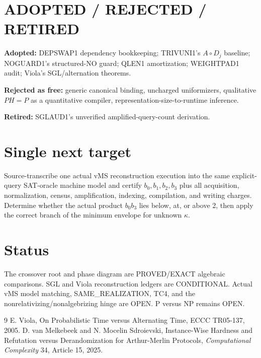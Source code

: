 \documentclass[11pt]{article}
\begin{document}
\section*{ADOPTED / REJECTED / RETIRED}
\textbf{Adopted:} DEPSWAP1 dependency bookkeeping; TRIVUNI1's \(A\circ D_j\) baseline; NOGUARD1's structured-NO guard; QLEN1 amortization; WEIGHTPAD1 audit; Viola's SGL/alternation theorems.

\textbf{Rejected as free:} generic canonical binding, uncharged uniformizers, qualitative \(PH=P\) as a quantitative compiler, representation-size-to-runtime inference.

\textbf{Retired:} SGLAUD1's unverified amplified-query-count derivation.

\section*{Single next target}
Source-transcribe one actual vMS reconstruction execution into the same explicit-query SAT-oracle machine model and certify \(b_0,b_1,b_2,b_3\) plus all acquisition, normalization, census, amplification, indexing, compilation, and writing charges. Determine whether the actual product \(b_0b_3\) lies below, at, or above 2, then apply the correct branch of the minimum envelope for unknown \(\kappa\).

\section*{Status}
The crossover root and phase diagram are PROVED/EXACT algebraic comparisons. SGL and Viola reconstruction ledgers are CONDITIONAL. Actual vMS model matching, SAME_REALIZATION, TC4, and the nonrelativizing/nonalgebrizing hinge are OPEN. P versus NP remains OPEN.

\begin{thebibliography}{9}
 E. Viola, On Probabilistic Time versus Alternating Time, ECCC TR05-137, 2005.
 D. van Melkebeek and N. Mocelin Sdroievski, Instance-Wise Hardness and Refutation versus Derandomization for Arthur-Merlin Protocols, \emph{Computational Complexity} 34, Article 15, 2025.
\end{thebibliography}
\end{document}
